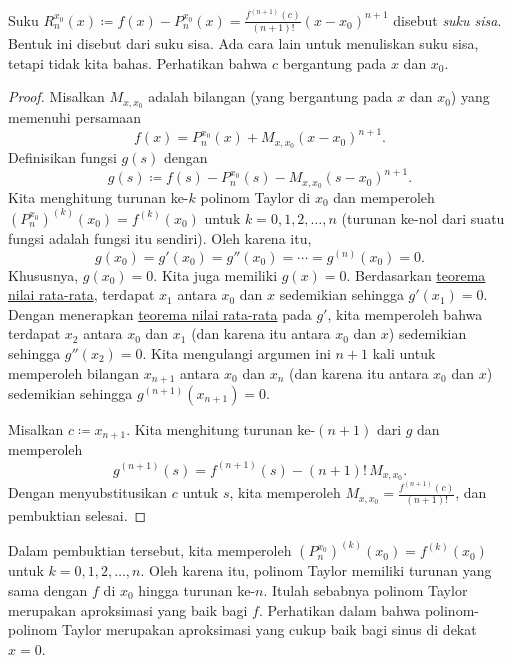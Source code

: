 Suku $R_n^{x_0}(x)\coloneqq
f(x)-P_n^{x_0}(x) =
\frac{f^{(n+1)}(c)}{(n+1)!}{(x-x_0)}^{n+1}$ disebut
\emph{suku sisa}.  Bentuk ini
disebut
\emph{} dari suku sisa.  Ada cara lain
untuk menuliskan suku sisa, tetapi tidak kita bahas.  Perhatikan bahwa $c$ bergantung pada
$x$ dan $x_0$.

\begin{proof}
Misalkan $M_{x,x_0}$ adalah bilangan (yang bergantung pada $x$ dan $x_0$) yang memenuhi persamaan
\begin{equation*}
f(x)=P_{n}^{x_0}(x)+M_{x,x_0}{(x-x_0)}^{n+1} .
\end{equation*}
Definisikan fungsi $g(s)$ dengan
\begin{equation*}
g(s) \coloneqq f(s)-P_n^{x_0}(s)-M_{x,x_0}{(s-x_0)}^{n+1} .
\end{equation*}
Kita menghitung
turunan ke-$k$ polinom Taylor di $x_0$ dan memperoleh
${(P_n^{x_0})}^{(k)}(x_0) = f^{(k)}(x_0)$ untuk
$k=0,1,2,\ldots,n$ (turunan ke-nol dari suatu fungsi adalah fungsi itu
sendiri).  Oleh karena itu,
\begin{equation*}
g(x_0) = g'(x_0) = g''(x_0) = \cdots = g^{(n)}(x_0) = 0 .
\end{equation*}
Khususnya, $g(x_0) = 0$.
Kita juga memiliki $g(x) = 0$.
Berdasarkan
\hyperref[thm:mvt]{teorema nilai rata-rata},
terdapat $x_1$ antara $x_0$ dan $x$ sedemikian sehingga $g'(x_1) = 0$.
Dengan menerapkan \hyperref[thm:mvt]{teorema nilai rata-rata}
pada $g'$, kita memperoleh bahwa terdapat
$x_2$ antara $x_0$ dan $x_1$ (dan karena itu antara $x_0$ dan $x$)
sedemikian sehingga $g''(x_2) = 0$.  Kita mengulangi
argumen ini $n+1$ kali untuk memperoleh bilangan $x_{n+1}$ antara $x_0$ dan $x_n$
(dan karena itu antara $x_0$ dan $x$) sedemikian sehingga $g^{(n+1)}(x_{n+1}) = 0$.

Misalkan $c \coloneqq x_{n+1}$.
Kita menghitung turunan ke-$(n+1)$ dari $g$ dan memperoleh
\begin{equation*}
g^{(n+1)}(s) = f^{(n+1)}(s)-(n+1)!\,M_{x,x_0} .
\end{equation*}
Dengan menyubstitusikan $c$ untuk $s$, kita memperoleh $M_{x,x_0} = \frac{f^{(n+1)}(c)}{(n+1)!}$, dan
pembuktian selesai.
\end{proof}

Dalam pembuktian tersebut, kita memperoleh
${(P_n^{x_0})}^{(k)}(x_0) = f^{(k)}(x_0)$ untuk $k=0,1,2,\ldots,n$.
Oleh karena itu, polinom Taylor memiliki turunan yang sama dengan $f$ di $x_0$
hingga turunan ke-$n$.  Itulah sebabnya polinom Taylor merupakan
aproksimasi yang baik bagi $f$.
Perhatikan dalam  bahwa polinom-polinom Taylor merupakan
aproksimasi yang cukup baik bagi sinus di dekat $x=0$.

